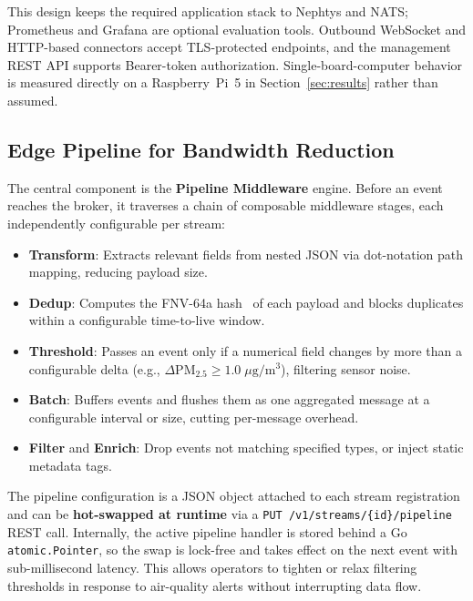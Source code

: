 \documentclass[conference]{IEEEtran}
\begin{document}
This design keeps the required application stack to Nephtys and NATS; Prometheus and Grafana are optional evaluation tools. Outbound WebSocket and HTTP-based connectors accept TLS-protected endpoints, and the management REST API supports Bearer-token authorization. Single-board-computer behavior is measured directly on a Raspberry~Pi~5 in Section~\ref{sec:results} rather than assumed.

\subsection{Edge Pipeline for Bandwidth Reduction}

The central component is the \textbf{Pipeline Middleware} engine. Before an event reaches the broker, it traverses a chain of composable middleware stages, each independently configurable per stream:

\begin{itemize}
  \item \textbf{Transform}: Extracts relevant fields from nested JSON via dot-notation path mapping, reducing payload size.
  \item \textbf{Dedup}: Computes the FNV-64a hash~\cite{fnv2019} of each payload and blocks duplicates within a configurable time-to-live window.
  \item \textbf{Threshold}: Passes an event only if a numerical field changes by more than a configurable delta (e.g., $\Delta\mathrm{PM}_{2.5} \geq 1.0\;\mu\mathrm{g/m^3}$), filtering sensor noise.
  \item \textbf{Batch}: Buffers events and flushes them as one aggregated message at a configurable interval or size, cutting per-message overhead.
  \item \textbf{Filter} and \textbf{Enrich}: Drop events not matching specified types, or inject static metadata tags.
\end{itemize}

The pipeline configuration is a JSON object attached to each stream registration and can be \textbf{hot-swapped at runtime} via a \texttt{PUT /v1/streams/\{id\}/pipeline} REST call. Internally, the active pipeline handler is stored behind a Go \texttt{atomic.Pointer}, so the swap is lock-free and takes effect on the next event with sub-millisecond latency. This allows operators to tighten or relax filtering thresholds in response to air-quality alerts without interrupting data flow.

\end{document}
